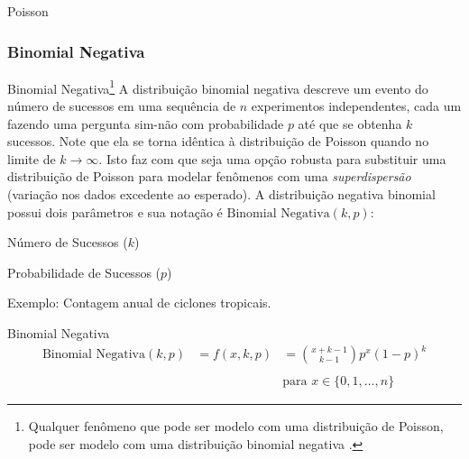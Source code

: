 \begin{frame}{Poisson}
	\centering
\end{frame}

\subsubsection{Binomial Negativa}
\begin{frame}{Binomial Negativa\footnote{Qualquer fenômeno que pode ser modelo com uma distribuição de Poisson, pode ser modelo com uma distribuição binomial negativa \parencite{gelman2013bayesian, gelman2020regression}.}}
	\small
	A distribuição binomial negativa descreve um evento do número de sucessos em uma
	sequência de $n$ experimentos independentes, cada um fazendo uma pergunta sim-não
	com probabilidade $p$ até que se obtenha $k$ sucessos. Note que ela se torna
	idêntica à distribuição de Poisson quando no limite de $k \to \infty$. Isto faz
	com que seja uma opção robusta para substituir uma distribuição de Poisson para
	modelar fenômenos com uma \textit{superdispersão} (variação nos dados excedente ao
	esperado).
	\vfill \small
	A distribuição negativa binomial possui dois parâmetros e sua notação é
	$\text{Binomial Negativa}(k, p)$:
	\begin{vfilleditems}
		\small
		\item Número de Sucessos ($k$)
		\item Probabilidade de Sucessos ($p$)
	\end{vfilleditems}
	\vfil \small
	Exemplo: Contagem anual de ciclones tropicais.
\end{frame}

\begin{frame}{Binomial Negativa}
	$$
		\begin{aligned}
			\text{Binomial Negativa}(k, p) & = f(x, k, p) & = \binom{x + k - 1}{k - 1}p^{x}(1-p)^{k} \\
			\\
			                               & ~            & \text{para $x \in \{0, 1, \dots, n\}$}
		\end{aligned}
	$$
\end{frame}

